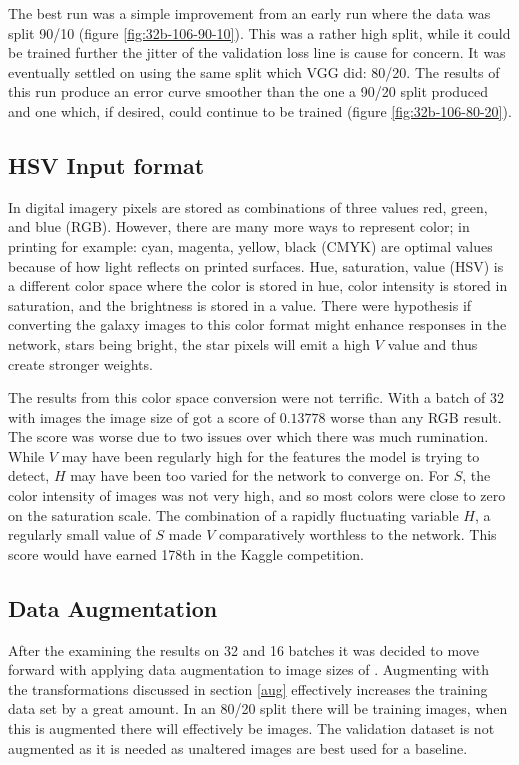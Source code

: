 The best run was a simple improvement from an early run where the data was split 90/10 (figure \ref{fig:32b-106-90-10}). This was a rather high split, while it could be trained further the jitter of the validation loss line is cause for concern. It was eventually settled on using the same split which VGG did: 80/20. The results of this run produce an error curve smoother than the one a 90/20 split produced and one which, if desired, could continue to be trained (figure \ref{fig:32b-106-80-20}).

\subsection{HSV Input format}

In digital imagery pixels are stored as combinations of three values red, green, and blue (RGB). However, there are many more ways to represent color; in printing for example: cyan, magenta, yellow, black (CMYK) are optimal values because of how light reflects on printed surfaces. Hue, saturation, value (HSV) is a different color space where the color is stored in hue, color intensity is stored in saturation, and the brightness is stored in a value. There were hypothesis if converting the galaxy images to this color format might enhance responses in the network, stars being bright, the star pixels will emit a high $V$ value and thus create stronger weights.

The results from this color space conversion were not terrific. With a batch of 32 with images the image size of  got a score of $0.13778$ worse than any RGB result. The score was worse due to two issues over which there was much rumination. While $V$ may have been regularly high for the features the model is trying to detect, $H$ may have been too varied for the network to converge on. For $S$, the color intensity of images was not very high, and so most colors were close to zero on the saturation scale. The combination of a rapidly fluctuating variable $H$, a regularly small value of $S$ made $V$ comparatively worthless to the network. This score would have earned 178th in the Kaggle competition.

\subsection{Data Augmentation}
After the examining the results on 32 and 16 batches it was decided to move forward with applying data augmentation to image sizes of . Augmenting with the transformations discussed in section \ref{aug} effectively increases the training data set by a great amount. In an 80/20 split there will be  training images, when this is augmented there will effectively be  images. The validation dataset is not augmented as it is needed as unaltered images are best used for a baseline.

